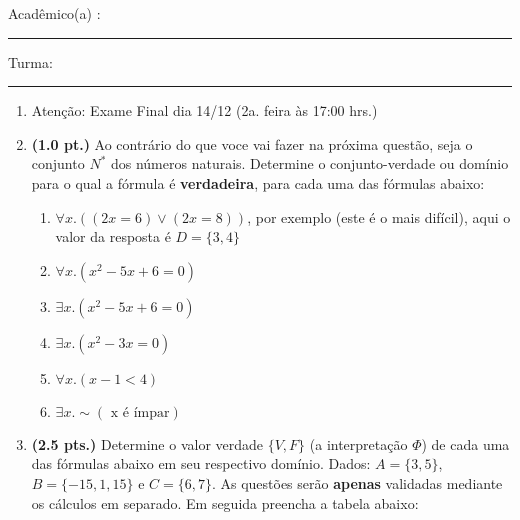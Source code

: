 \documentclass[a4paper,11pt]{article}
\begin{document}


\vskip 0.5cm Acad\^emico(a) : \rule{10cm}{0.4pt} Turma:  \rule{1cm}{0.4pt}

\begin{enumerate}

\item Atenção: Exame Final dia 14/12 (2a. feira às 17:00 hrs.)


\item {\bf (1.0 pt.)} Ao contrário  do que voce vai fazer na próxima questão,
seja o conjunto $N^\ast$ dos números naturais. Determine o 
conjunto-verdade ou domínio para o qual a fórmula é \textbf{verdadeira},  
para cada  uma das fórmulas abaixo:

\begin{enumerate}
\itemsep -2pt
   \item $\forall x . ((2x = 6) \vee (2x = 8)) $, por exemplo (este é o mais difícil), aqui o valor da resposta é $D=\{3, 4\}$
    \item $\forall x . (x^2 - 5x + 6 = 0)$
        \item $\exists x . (x^2 - 5x + 6 = 0)$
   \item $\exists x . (x^2 - 3x = 0)$ 
      \item $\forall x . (x-1 < 4 )$
     \item $\exists x . \sim (\text{ x é ímpar})$ 
 \end{enumerate} 



\item {\bf (2.5 pts.)} Determine o valor verdade $\{V, F \}$ (a interpretação $\Phi $)
de cada uma das fórmulas abaixo em seu respectivo domínio. Dados: $A = \{ 3,  5 \}$, $B = \{ -15, 1, 15\}$ e  $C = \{ 6,  7 \}$.
As questões serão \textbf{apenas} validadas mediante os cálculos em separado. Em seguida preencha a tabela abaixo:



\end{enumerate}
\end{document}
